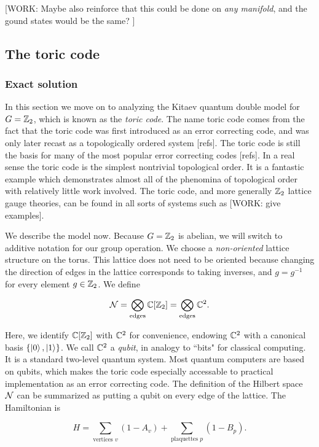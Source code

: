 \documentclass{article}
\theoremstyle{definition}
\numberwithin{figure}{section}
\begin{document}
[WORK: Maybe also reinforce that this could be done on \textit{any manifold}, and the gound states would be the same? ]

\subsection{The toric code}

\subsubsection{Exact solution}

In this section we move on to analyzing the Kitaev quantum double model for $G=\mathbb{Z}_2$, which is known as the \textit{toric code}. The name toric code comes from the fact that the toric code was first introduced as an error correcting code, and was only later recast as a topologically ordered system [refs]. The toric code is still the basis for many of the most popular error correcting codes [refs]. In a real sense the toric code is the simplest nontrivial topological order. It is a fantastic example which demonstrates almost all of the phenomina of topological order with relatively little work involved. The toric code, and more generally $\mathbb{Z}_2$ lattice gauge theories, can be found in all sorts of systems such as [WORK: give examples]. 

We describe the model now. Because $G=\mathbb{Z}_2$ is abelian, we will switch to additive notation for our group operation. We choose a \textit{non-oriented} lattice structure on the torus. This lattice does not need to be oriented because changing the direction of edges in the lattice corresponds to taking inverses, and $g=g^{-1}$ for every element $g\in \mathbb{Z}_2$. We define

$$\mathcal{N} = \bigotimes_{\text{edges}}\mathbb{C}[\mathbb{Z}_2]=\bigotimes_{\text{edges}}\mathbb{C}^2.$$

Here, we identify $\mathbb{C}[\mathbb{Z}_2]$ with $\mathbb{C}^2$ for convenience, endowing $\mathbb{C}^2$ with a canonical basis $\{\ket{0},\ket{1}\}$. We call $\mathbb{C}^2$ a \textit{qubit}, in analogy to ``bits" for classical computing. It is a standard two-level quantum system. Most quantum computers are based on qubits, which makes the toric code especially accessable to practical implementation as an error correcting code. The definition of the Hilbert space $\mathcal{N}$ can be summarized as putting a qubit on every edge of the lattice. The Hamiltonian is

$$H=\sum_{\text{vertices }v}(1-A_v)+\sum_{\text{plaquettes }p}(1-B_p).$$
\end{document}
